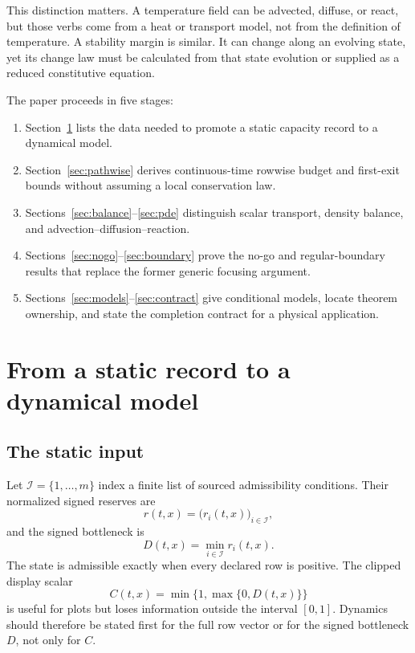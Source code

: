\documentclass[11pt]{article}
\theoremstyle{definition}
\theoremstyle{remark}
\newcommand{\cI}{\mathcal I}
\begin{document}
This distinction matters.  A temperature field can be advected, diffuse,
or react, but those verbs come from a heat or transport model, not from the
definition of temperature.  A stability margin is similar.  It can change
along an evolving state, yet its change law must be calculated from that
state evolution or supplied as a reduced constitutive equation.

The paper proceeds in five stages:
\begin{enumerate}[leftmargin=2em]
\item Section~\ref{sec:promotion} lists the data needed to promote a static
      capacity record to a dynamical model.
\item Section~\ref{sec:pathwise} derives continuous-time rowwise budget and
      first-exit bounds without assuming a local conservation law.
\item Sections~\ref{sec:balance}--\ref{sec:pde} distinguish scalar
      transport, density balance, and advection--diffusion--reaction.
\item Sections~\ref{sec:nogo}--\ref{sec:boundary} prove the no-go and
      regular-boundary results that replace the former generic focusing
      argument.
\item Sections~\ref{sec:models}--\ref{sec:contract} give conditional
      models, locate theorem ownership, and state the completion contract
      for a physical application.
\end{enumerate}

\section{From a static record to a dynamical model}
\label{sec:promotion}

\subsection{The static input}

Let \(\cI=\{1,\ldots,m\}\) index a finite list of sourced admissibility
conditions.  Their normalized signed reserves are
\[
 r(t,x)=\bigl(r_i(t,x)\bigr)_{i\in\cI},
\]
and the signed bottleneck is
\[
 D(t,x)=\min_{i\in\cI}r_i(t,x).
\]
The state is admissible exactly when every declared row is positive.
The clipped display scalar
\[
 C(t,x)=\min\{1,\max\{0,D(t,x)\}\}
\]
is useful for plots but loses information outside the interval
\([0,1]\).  Dynamics should therefore be stated first for the full row
vector or for the signed bottleneck \(D\), not only for \(C\).
\end{document}
